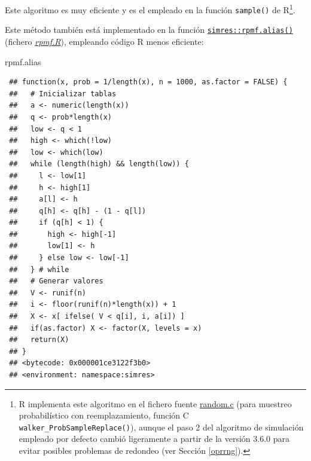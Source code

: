 \documentclass[
  10pt,
]{book}
\newenvironment{Shaded}{\begin{snugshade}}{\end{snugshade}}
\newcommand{\NormalTok}[1]{#1}
\theoremstyle{break}
\theoremstyle{nonumberplain}
\let\oldfootnote\footnote
\renewcommand\footnote[1]{\oldfootnote{\hspace{2mm}#1}}
\begin{document}
Este algoritmo es muy eficiente y es el empleado en la función \texttt{sample()} de R\footnote{R implementa este algoritmo en el fichero fuente \href{https://svn.r-project.org/R/trunk/src/main/random.c}{random.c} (para muestreo probabilístico con reemplazamiento, función C \texttt{walker\_ProbSampleReplace()}), aunque el paso 2 del algoritmo de simulación empleado por defecto cambió ligeramente a partir de la versión 3.6.0 para evitar posibles problemas de redondeo (ver Sección \ref{oprrng}).}.

Este método también está implementado en la función \href{https://rubenfcasal.github.io/simres/reference/rpmf.alias.html}{\texttt{simres::rpmf.alias()}} (fichero \href{R/rpmf.R}{\emph{rpmf.R}}), empleando código R menos eficiente:

\begin{Shaded}
\begin{Highlighting}[]
\NormalTok{rpmf.alias}
\end{Highlighting}
\end{Shaded}

\begin{verbatim}
 ## function(x, prob = 1/length(x), n = 1000, as.factor = FALSE) {
 ##   # Inicializar tablas
 ##   a <- numeric(length(x))
 ##   q <- prob*length(x)
 ##   low <- q < 1
 ##   high <- which(!low)
 ##   low <- which(low)
 ##   while (length(high) && length(low)) {
 ##     l <- low[1]
 ##     h <- high[1]
 ##     a[l] <- h
 ##     q[h] <- q[h] - (1 - q[l])
 ##     if (q[h] < 1) {
 ##       high <- high[-1]
 ##       low[1] <- h
 ##     } else low <- low[-1]
 ##   } # while
 ##   # Generar valores
 ##   V <- runif(n)
 ##   i <- floor(runif(n)*length(x)) + 1
 ##   X <- x[ ifelse( V < q[i], i, a[i]) ]
 ##   if(as.factor) X <- factor(X, levels = x)
 ##   return(X)
 ## }
 ## <bytecode: 0x000001ce3122f3b0>
 ## <environment: namespace:simres>
\end{verbatim}
\end{document}
